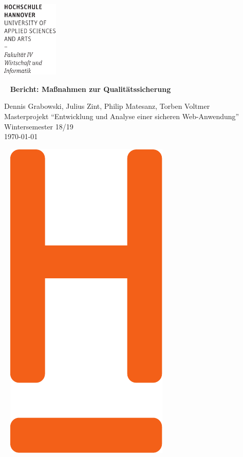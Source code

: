 \documentclass[12pt,DIV14,BCOR10mm,a4paper,twoside,parskip=half-,headsepline,headinclude,english,ngerman,bibliography=totocnumbered]{scrreprt}
\begin{document}
  \thispagestyle{empty} %
\includegraphics[width=0.2\textwidth]{Wortmarke_WI_schwarz}

   {  ~ \sffamily
  \vfill
  {\Huge\bfseries Bericht: Maßnahmen zur Qualitätssicherung}
  \bigskip

  {\Large
  Dennis Grabowski, Julius Zint, Philip Matesanz, Torben Voltmer \\[2ex]
  Masterprojekt \enquote{Entwicklung und Analyse einer sicheren Web-Anwendung} \\
  Wintersemester 18/19
 \\[5ex]
   \today }
}
 \vfill

  ~ \hfill
  \includegraphics[height=0.3\paperheight]{H_WI_Pantone1665}

\vspace*{-3cm}
\end{document}
